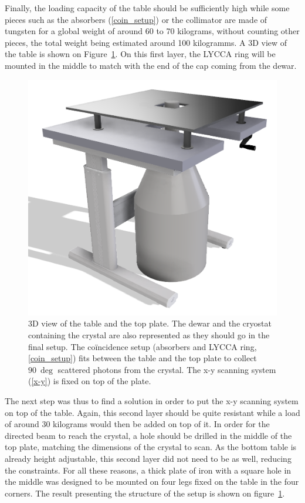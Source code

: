 \documentclass[11pt,a4paper]{article}
\begin{document}
Finally, the loading capacity of the table should be sufficiently high while some pieces such as the absorbers (\ref{coin_setup}) or the collimator are made of tungsten for a global weight of around 60 to 70 kilograms, without counting other pieces, the total weight being estimated around 100 kilogramms. A 3D view of the table is shown on Figure~\ref{table}. On this first layer, the LYCCA ring will be mounted in the middle to match with the end of the cap coming from the dewar.

\begin{figure}[!h]
\centering
\includegraphics[scale=0.5]{table.png}
\caption{3D view of the table and the top plate. The dewar and the cryostat containing the crystal are also represented as they should go in the final setup. The coïncidence setup (absorbers and LYCCA ring, \ref{coin_setup}) fits between the table and the top plate to collect $90~\deg$ scattered photons from the crystal. The x-y scanning system (\ref{x-y}) is fixed on top of the plate.}
\label{table}
\end{figure}

The next step was thus to find a solution in order to put the x-y scanning system on top of the table. Again, this second layer should be quite resistant while a load of around 30 kilograms would then be added on top of it. In order for the directed beam to reach the crystal, a hole should be drilled in the middle of the top plate, matching the dimensions of the crystal to scan. As the bottom table is already height adjustable, this second layer did not need to be as well, reducing the constraints. For all these reasons, a thick plate of iron with a square hole in the middle was designed to be mounted on four legs fixed on the table in the four corners. The result presenting the structure of the setup is shown on figure~\ref{table}.
\end{document}
